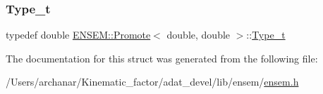 \subsubsection{\texorpdfstring{Type\_t}{Type\_t}\hspace{0.1cm}{\footnotesize\ttfamily [2/2]}}
{\footnotesize\ttfamily typedef double \mbox{\hyperlink{structENSEM_1_1Promote}{E\+N\+S\+E\+M\+::\+Promote}}$<$ double, double $>$\+::\mbox{\hyperlink{structENSEM_1_1Promote_3_01double_00_01double_01_4_a24ebc4a5bef63c7bb489c2cf17b184ab}{Type\+\_\+t}}}



The documentation for this struct was generated from the following file\+:\begin{DoxyCompactItemize}
\item 
/\+Users/archanar/\+Kinematic\+\_\+factor/adat\+\_\+devel/lib/ensem/\mbox{\hyperlink{lib_2ensem_2ensem_8h}{ensem.\+h}}\end{DoxyCompactItemize}
